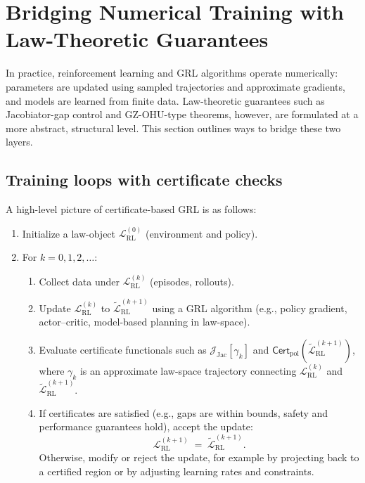 \documentclass[11pt]{book}
\theoremstyle{plain}
\theoremstyle{definition}
\theoremstyle{remark}
\begin{document}
\section{Bridging Numerical Training with Law-Theoretic Guarantees}
\label{sec:bridging-numerical-lawtheoretic}


In practice, reinforcement learning and GRL algorithms operate
numerically: parameters are updated using sampled trajectories and
approximate gradients, and models are learned from finite data.
Law-theoretic guarantees such as Jacobiator-gap control and
GZ-OHU-type theorems, however, are formulated at a more abstract,
structural level. This section outlines ways to bridge these two
layers.

\subsection*{Training loops with certificate checks}

A high-level picture of certificate-based GRL is as follows:
\begin{enumerate}
  \item Initialize a law-object $\mathcal{L}_{\mathrm{RL}}^{(0)}$
        (environment and policy).
  \item For $k = 0,1,2,\dots$:
        \begin{enumerate}
          \item Collect data under $\mathcal{L}_{\mathrm{RL}}^{(k)}$
                (episodes, rollouts).
          \item Update $\mathcal{L}_{\mathrm{RL}}^{(k)}$ to
                $\tilde{\mathcal{L}}_{\mathrm{RL}}^{(k+1)}$ using a
                GRL algorithm (e.g., policy gradient, actor--critic,
                model-based planning in law-space).
          \item Evaluate certificate functionals such as
                $\mathcal{J}_{\mathrm{Jac}}[\gamma_k]$ and
                $\mathsf{Cert}_{\mathrm{pol}}(\tilde{\mathcal{L}}_{\mathrm{RL}}^{(k+1)})$,
                where $\gamma_k$ is an approximate law-space
                trajectory connecting
                $\mathcal{L}_{\mathrm{RL}}^{(k)}$ and
                $\tilde{\mathcal{L}}_{\mathrm{RL}}^{(k+1)}$.
          \item If certificates are satisfied (e.g., gaps are within
                bounds, safety and performance guarantees hold),
                accept the update:
                \[
                   \mathcal{L}_{\mathrm{RL}}^{(k+1)}
                   \;=\;
                   \tilde{\mathcal{L}}_{\mathrm{RL}}^{(k+1)}.
                \]
                Otherwise, modify or reject the update, for example
                by projecting back to a certified region or by
                adjusting learning rates and constraints.
        \end{enumerate}
\end{enumerate}
\end{document}
